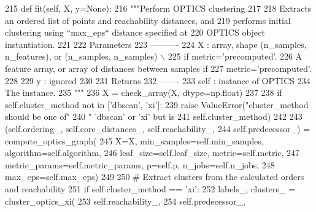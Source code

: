 \begin{DoxyCode}
215     \textcolor{keyword}{def }fit(self, X, y=None):
216         \textcolor{stringliteral}{"""Perform OPTICS clustering}
217 \textcolor{stringliteral}{}
218 \textcolor{stringliteral}{        Extracts an ordered list of points and reachability distances, and}
219 \textcolor{stringliteral}{        performs initial clustering using ``max\_eps`` distance specified at}
220 \textcolor{stringliteral}{        OPTICS object instantiation.}
221 \textcolor{stringliteral}{}
222 \textcolor{stringliteral}{        Parameters}
223 \textcolor{stringliteral}{        ----------}
224 \textcolor{stringliteral}{        X : array, shape (n\_samples, n\_features), or (n\_samples, n\_samples)  \(\backslash\)}
225 \textcolor{stringliteral}{if metric=’precomputed’.}
226 \textcolor{stringliteral}{            A feature array, or array of distances between samples if}
227 \textcolor{stringliteral}{            metric='precomputed'.}
228 \textcolor{stringliteral}{}
229 \textcolor{stringliteral}{        y : ignored}
230 \textcolor{stringliteral}{}
231 \textcolor{stringliteral}{        Returns}
232 \textcolor{stringliteral}{        -------}
233 \textcolor{stringliteral}{        self : instance of OPTICS}
234 \textcolor{stringliteral}{            The instance.}
235 \textcolor{stringliteral}{        """}
236         X = check\_array(X, dtype=np.float)
237 
238         \textcolor{keywordflow}{if} self.cluster\_method \textcolor{keywordflow}{not} \textcolor{keywordflow}{in} [\textcolor{stringliteral}{'dbscan'}, \textcolor{stringliteral}{'xi'}]:
239             \textcolor{keywordflow}{raise} ValueError(\textcolor{stringliteral}{"cluster\_method should be one of"}
240                              \textcolor{stringliteral}{" 'dbscan' or 'xi' but is %
241                              self.cluster\_method)
242 
243         (self.ordering\_, self.core\_distances\_, self.reachability\_,
244          self.predecessor\_) = compute\_optics\_graph(
245              X=X, min\_samples=self.min\_samples, algorithm=self.algorithm,
246              leaf\_size=self.leaf\_size, metric=self.metric,
247              metric\_params=self.metric\_params, p=self.p, n\_jobs=self.n\_jobs,
248              max\_eps=self.max\_eps)
249 
250         \textcolor{comment}{# Extract clusters from the calculated orders and reachability}
251         \textcolor{keywordflow}{if} self.cluster\_method == \textcolor{stringliteral}{'xi'}:
252             labels\_, clusters\_ = cluster\_optics\_xi(
253                 self.reachability\_,
254                 self.predecessor\_,
}
\end{DoxyCode}
